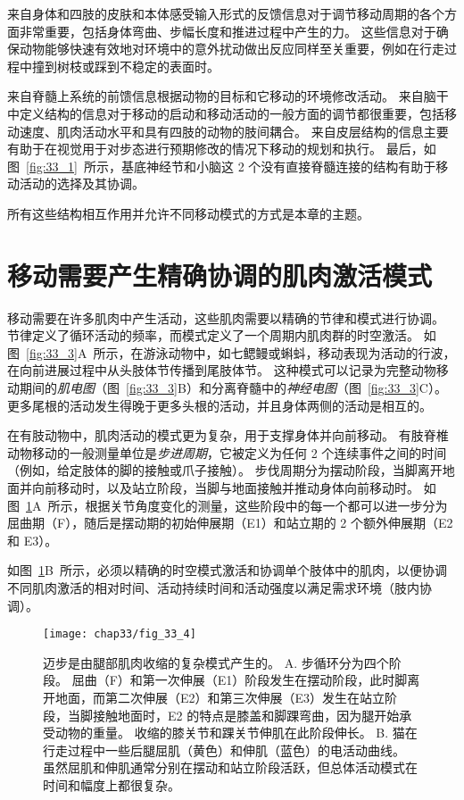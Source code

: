 来自身体和四肢的皮肤和本体感受输入形式的反馈信息对于调节移动周期的各个方面非常重要，包括身体弯曲、步幅长度和推进过程中产生的力。
这些信息对于确保动物能够快速有效地对环境中的意外扰动做出反应同样至关重要，例如在行走过程中撞到树枝或踩到不稳定的表面时。


来自脊髓上系统的前馈信息根据动物的目标和它移动的环境修改活动。
来自脑干中定义结构的信息对于移动的启动和移动活动的一般方面的调节都很重要，包括移动速度、肌肉活动水平和具有四肢的动物的肢间耦合。
来自皮层结构的信息主要有助于在视觉用于对步态进行预期修改的情况下移动的规划和执行。
最后，如图~\ref{fig:33_1}~所示，基底神经节和小脑这 2 个没有直接脊髓连接的结构有助于移动活动的选择及其协调。


所有这些结构相互作用并允许不同移动模式的方式是本章的主题。



\section{移动需要产生精确协调的肌肉激活模式}

移动需要在许多肌肉中产生活动，这些肌肉需要以精确的节律和模式进行协调。
节律定义了循环活动的频率，而模式定义了一个周期内肌肉群的时空激活。
如图~\ref{fig:33_3}A~所示，在游泳动物中，如七鳃鳗或蝌蚪，移动表现为活动的行波，在向前进展过程中从头肢体节传播到尾肢体节。
这种模式可以记录为完整动物移动期间的\textit{肌电图}（图~\ref{fig:33_3}B）和分离脊髓中的\textit{神经电图}（图~\ref{fig:33_3}C）。
更多尾根的活动发生得晚于更多头根的活动，并且身体两侧的活动是相互的。


在有肢动物中，肌肉活动的模式更为复杂，用于支撑身体并向前移动。
有肢脊椎动物移动的一般测量单位是\textit{步进周期}，它被定义为任何 2 个连续事件之间的时间（例如，给定肢体的脚的接触或爪子接触）。
步伐周期分为摆动阶段，当脚离开地面并向前移动时，以及站立阶段，当脚与地面接触并推动身体向前移动时。
如图~\ref{fig:33_4}A~所示，根据关节角度变化的测量，这些阶段中的每一个都可以进一步分为屈曲期（F），随后是摆动期的初始伸展期（E1）和站立期的 2 个额外伸展期（E2 和 E3）。


如图~\ref{fig:33_4}B~所示，必须以精确的时空模式激活和协调单个肢体中的肌肉，以便协调不同肌肉激活的相对时间、活动持续时间和活动强度以满足需求环境（肢内协调）。


\begin{figure}[htbp]
	\centering
	\texttt{[image: chap33/fig\_33\_4]}
	\caption{迈步是由腿部肌肉收缩的复杂模式产生的。
	A. 步循环分为四个阶段。
	屈曲（F）和第一次伸展（E1）阶段发生在摆动阶段，此时脚离开地面，而第二次伸展（E2）和第三次伸展（E3）发生在站立阶段，当脚接触地面时，E2 的特点是膝盖和脚踝弯曲，因为腿开始承受动物的重量。
	收缩的膝关节和踝关节伸肌在此阶段伸长\cite{engberg1969electromyographic}。
	B. 猫在行走过程中一些后腿屈肌（黄色）和伸肌（蓝色）的电活动曲线。
	虽然屈肌和伸肌通常分别在摆动和站立阶段活跃，但总体活动模式在时间和幅度上都很复杂。}
	\label{fig:33_4}
\end{figure}


